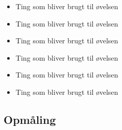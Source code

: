 \begin{itemize}
  \item    Ting som bliver brugt til øvelsen
  \item    Ting som bliver brugt til øvelsen
  \item    Ting som bliver brugt til øvelsen
  \item    Ting som bliver brugt til øvelsen
  \item    Ting som bliver brugt til øvelsen
  \item    Ting som bliver brugt til øvelsen
\end{itemize}

\subsection*{Opmåling} 